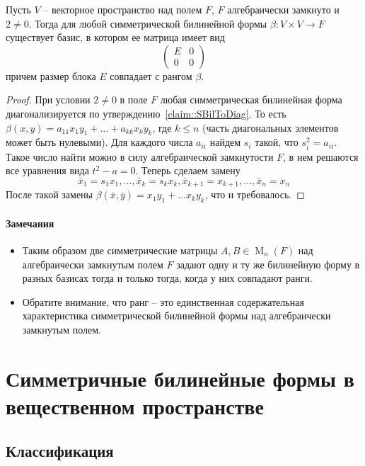 \begin{claim}
Пусть $V$ -- векторное пространство над полем $F$, $F$ алгебраически замкнуто и $ 2 \neq 0$.
Тогда для любой симметрической билинейной формы $\beta\colon V\times V\to F$ существует базис, в котором ее матрица имеет вид
\[
\begin{pmatrix}
{E}&{0}\\
{0}&{0}
\end{pmatrix}
\]
причем размер блока $E$ совпадает с рангом $\beta$.
\end{claim}
\begin{proof}
При условии $2\neq 0$ в поле $F$ любая симметрическая билинейная форма диагонализируется по утверждению~\ref{claim::SBilToDiag}.
То есть $\beta(x,y) = a_{11}x_1 y_1 + \ldots + a_{kk}x_ky_k$, где $k\leqslant n$ (часть диагональных элементов может быть нулевыми).
Для каждого числа $a_{ii}$ найдем $s_i$ такой, что $s_i^2 = a_{ii}$.
Такое число найти можно в силу алгебраической замкнутости $F$, в нем решаются все уравнения вида $t^2 - a = 0$.
Теперь сделаем замену
\[
\bar x_1 = s_1 x_1,\ldots,\bar x_k = s_k x_k, \bar x_{k+1} = x_{k+1},\ldots,\bar x_n = x_n
\]
После такой замены $\beta(\bar x,\bar y) = x_1y_1 + \ldots x_k y_k$, что и требовалось.
\end{proof}

\paragraph{Замечания}

\begin{itemize}
\item Таким образом две симметрические матрицы $A,B\in \operatorname{M}_n(F)$ над алгебраически замкнутым полем $F$ задают одну и ту же билинейную форму в разных базисах тогда и только тогда, когда у них совпадают ранги.

\item Обратите внимание, что ранг -- это единственная содержательная характеристика симметрической билинейной формы над алгебраически замкнутым полем.
\end{itemize}

\section{Симметричные билинейные формы в вещественном пространстве}

\subsection{Классификация}

